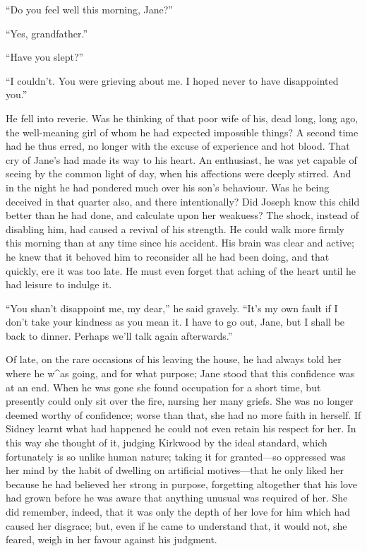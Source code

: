 ``Do you feel well this morning, Jane?''

``Yes, grandfather.''

``Have you slept?''

``I couldn't. You were grieving about me. I hoped never to have
disappointed you.''

He fell into reverie. Was he thinking of that poor wife of his, dead
long, long ago, the well-meaning girl of whom he had expected impossible
things? A second time had he thus erred, no longer with the excuse of
{}experience and hot blood. That cry of Jane's had made its way to his
heart. An enthusiast, he was yet capable of seeing by the common light
of day, when his affections were deeply stirred. And in the night he had
pondered much over his son's behaviour. Was he being deceived in that
quarter also, and there intentionally? Did Joseph know this child better
than he had done, and calculate upon her weakuess? The shock, instead of
disabling him, had caused a revival of his strength. He could walk more
firmly this morning than at any time since his accident. His brain was
clear and active; he knew that it behoved him to reconsider all he had
been doing, and that quickly, ere it was too late. He must even forget
that aching of the heart until he had leisure to indulge it.

``You shan't disappoint me, my dear,'' he said gravely. ``It's my own
fault if I don't take your kindness as you mean it. I have to go out,
Jane, but I shall be back to dinner. Perhaps we'll talk again
afterwards.''

Of late, on the rare occasions of his leaving the house, he had always
told her where he w\^{}as going, and for what purpose; Jane {}stood that
this confidence was at an end. When he was gone she found occupation for
a short time, but presently could only sit over the fire, nursing her
many griefs. She was no longer deemed worthy of confidence; worse than
that, she had no more faith in herself. If Sidney learnt what had
happened he could not even retain his respect for her. In this way she
thought of it, judging Kirkwood by the ideal standard, which fortunately
is so unlike human nature; taking it for granted---so oppressed was her
mind by the habit of dwelling on artificial motives---that he only liked
her because he had believed her strong in purpose, forgetting altogether
that his love had grown before he was aware that anything unusual was
required of her. She did remember, indeed, that it was only the depth of
her love for him which had caused her disgrace; but, even if he came to
understand that, it would not, she feared, weigh in her favour against
his judgment.

